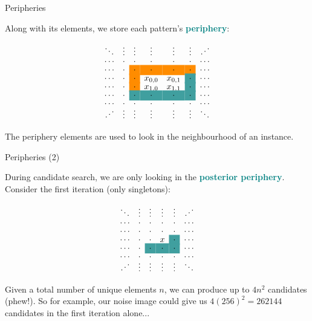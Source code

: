 \documentclass[11pt]{beamer}
\renewcommand{\bold}[1]{\textcolor{teal}{\textbf{#1}}}
\begin{document}

\begin{frame}{Peripheries}

Along with its elements, we store each pattern's \bold{periphery}:

\newcommand{\Ant}{\cellcolor{red!45!yellow}\cdot}
\newcommand{\Post}{\cellcolor{teal!75}\cdot}

$$
\begin{matrix}
\ddots & \vdots & \vdots & \vdots & \vdots & \vdots & \iddots \\[-.2em]
\cdots & \cdot & \cdot & \cdot & \cdot & \cdot & \cdots \\[-.2em]
\cdots & \cdot & \Ant  & \Ant  & \Ant  & \Ant  & \cdots \\[-.2em]
\cdots & \cdot & \Ant  & x_{0,0}& x_{0,1}& \Post & \cdots \\[-.2em]
\cdots & \cdot & \Ant  & x_{1,0}& x_{1,1}& \Post & \cdots \\[-.2em]
\cdots & \cdot & \Post & \Post & \Post & \Post & \cdots \\[-.2em]
\cdots & \cdot & \cdot & \cdot & \cdot & \cdot & \cdots \\[-.4em]
\iddots & \vdots & \vdots & \vdots & \vdots & \vdots & \ddots
\end{matrix}
$$

The periphery elements are used to look in the neighbourhood of an instance.

\end{frame}



\begin{frame}{Peripheries (2)}

During candidate search, we are only looking in the \bold{posterior periphery}. Consider the first iteration (only singletons):

\newcommand{\Ant}{\cellcolor{red!45!yellow}\cdot}
\newcommand{\Post}{\cellcolor{teal!75}\cdot}

$$
\begin{matrix}
\ddots & \vdots & \vdots & \vdots & \vdots & \iddots \\[-.2em]
\cdots & \cdot & \cdot & \cdot & \cdot & \cdots \\[-.2em]
\cdots & \cdot & \cdot & \cdot & \cdot & \cdots \\[-.2em]
\cdots & \cdot & \cdot  & x    & \Post & \cdots \\[-.2em]
\cdots & \cdot & \Post & \Post & \Post & \cdots \\[-.2em]
\cdots & \cdot & \cdot & \cdot & \cdot & \cdots \\[-.4em]
\iddots & \vdots & \vdots & \vdots & \vdots & \ddots
\end{matrix}
$$

Given a total number of unique elements $n$, we can produce up to $4n^2$ candidates (phew!). So for example, our noise image could give us $4(256)^2=262144$ candidates in the first iteration alone...

\end{frame}
\end{document}
